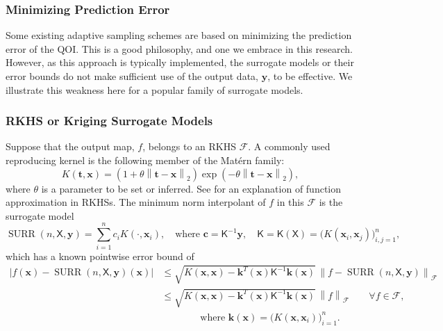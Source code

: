\documentclass[11pt]{NSFamsart}
\DeclareMathOperator{\SURR}{SURR}
\newcommand{\mK}{\mathsf{K}}
\newcommand{\mX}{\mathsf{X}}
\newcommand{\bc}{{\boldsymbol{c}}}
\newcommand{\bx}{{\boldsymbol{x}}}
\newcommand{\bk}{{\boldsymbol{k}}}
\newcommand{\by}{{\boldsymbol{y}}}
\newcommand{\bt}{{\boldsymbol{t}}}
\newcommand{\calf}{{\mathcal{F}}}
\def\abs#1{\ensuremath{\left \lvert #1 \right \rvert}}
\newcommand{\norm}[2][{}]{\ensuremath{\left \lVert #2 \right \rVert}_{#1}}
\begin{document}
\subsubsection{Minimizing Prediction Error} \label{sec:MinPredErr}

Some existing adaptive sampling schemes are based on minimizing the prediction error of the QOI.  This is a good philosophy, and one we embrace in this research.  However, as this approach is typically implemented, the surrogate models or their error bounds do not make sufficient use of the output data, $\by$, to be effective.   We illustrate this weakness here for a popular family of surrogate models.

\subsubsection{RKHS or Kriging Surrogate Models} \label{sec:RKHSKrigSurrModel}

Suppose that the output map, $f$, belongs to an RKHS $\calf$.  A commonly used reproducing kernel is the following member of the Mat\'ern family:
\begin{equation} \label{eq:MatKer}
    K(\bt,\bx) = (1 + \theta \norm[2]{\bt-\bx}) \exp(-\theta\norm[2]{\bt-\bx}),
\end{equation}
where $\theta$ is a parameter to be set or inferred.  See \cite{Buh00, Fas07a, FasMcC15a, ForFly15a, ForEtal09, SchWen06a, Wen05a} for an explanation of function approximation in RKHSs.  The minimum norm interpolant of $f$ in this $\calf$ is the surrogate model
\begin{equation} \label{appxExOne}
    \SURR(n,\mX,\by) = \sum_{i=1}^n c_i K(\cdot, \bx_i), \quad \text{where } \bc = \mK^{-1} \by, \quad \mK = \mK(\mX) = \bigl( K(\bx_i,\bx_j) \bigr)_{i,j=1}^n, 
\end{equation}
which has a known pointwise error bound of
\begin{align}
\label{RKHSErrBd}
    \abs{f(\bx) - \SURR(n,\mX,\by)(\bx)} & \le \sqrt{K(\bx,\bx) - \bk^T(\bx) \mK^{-1} \bk(\bx)} \, \norm[\calf]{f - \SURR(n,\mX,\by)} \\
    \nonumber
    & \le \sqrt{K(\bx,\bx) - \bk^T(\bx) \mK^{-1} \bk(\bx)} \, \norm[\calf]{f} \qquad \forall f \in \calf, \\
    \nonumber
    & \qquad \qquad \text{where }  \bk(\bx) = \bigl(K(\bx,\bx_i) \bigr)_{i=1}^n.
\end{align}
\end{document}
